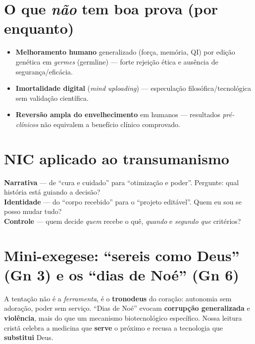 \section{O que \emph{não} tem boa prova (por enquanto)}
\begin{itemize}[leftmargin=*,noitemsep]
  \item \textbf{Melhoramento humano} generalizado (força, memória, QI) por edição genética em \emph{germes} (germline) --- forte rejeição ética e ausência de segurança/eficácia.
  \item \textbf{Imortalidade digital} (\emph{mind uploading}) --- especulação filosófica/tecnológica sem validação científica.
  \item \textbf{Reversão ampla do envelhecimento} em humanos --- resultados \emph{pré-clínicos} não equivalem a benefício clínico comprovado.
\end{itemize}

\section{NIC aplicado ao transumanismo}
\begin{nicbox}
\textbf{Narrativa} --- de ``cura e cuidado'' para ``otimização e poder''. Pergunte: qual história está guiando a decisão?\\
\textbf{Identidade} --- do ``corpo recebido'' para o ``projeto editável''. Quem eu sou se posso mudar tudo?\\
\textbf{Controle} --- quem decide \emph{quem} recebe o quê, \emph{quando} e \emph{segundo que} critérios?
\end{nicbox}

\section{Mini-exegese: ``sereis como Deus'' (Gn 3) e os ``dias de Noé'' (Gn 6)}
A tentação não é a \emph{ferramenta}, é o \textbf{tronodeus} do coração: autonomia sem adoração, poder sem serviço. ``Dias de Noé'' evocam \textbf{corrupção generalizada} e \textbf{violência}, mais do que um mecanismo biotecnológico específico. Nossa leitura cristã celebra a medicina que \textbf{serve} o próximo e recusa a tecnologia que \textbf{substitui} Deus.

